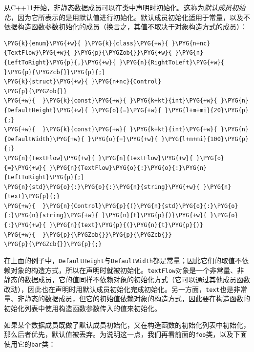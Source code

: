 
从C++11开始，非静态数据成员可以在类中声明时初始化。这称为\textit{默认成员初始化}，因为它所表示的是用默认值进行初始化。默认成员初始化适用于常量，以及不依据构造函数参数初始化的成员（换言之，其值不取决于对象构造方式的成员）：



\begin{codeblockbg}
\begin{Verbatim}[commandchars=\\\{\},breaklines=true,breakanywhere=true,fontsize=\codefont,xleftmargin=17bp]
\PYG{k}{enum}\PYG{+w}{ }\PYG{k}{class}\PYG{+w}{ }\PYG{n+nc}{TextFlow}\PYG{+w}{ }\PYG{p}{\PYGZob{}}\PYG{+w}{ }\PYG{n}{LeftToRight}\PYG{p}{,}\PYG{+w}{ }\PYG{n}{RightToLeft}\PYG{+w}{ }\PYG{p}{\PYGZcb{}}\PYG{p}{;}
\PYG{k}{struct}\PYG{+w}{ }\PYG{n+nc}{Control}
\PYG{p}{\PYGZob{}}
\PYG{+w}{  }\PYG{k}{const}\PYG{+w}{ }\PYG{k+kt}{int}\PYG{+w}{ }\PYG{n}{DefaultHeight}\PYG{+w}{ }\PYG{o}{=}\PYG{+w}{ }\PYG{l+m+mi}{20}\PYG{p}{;}
\PYG{+w}{  }\PYG{k}{const}\PYG{+w}{ }\PYG{k+kt}{int}\PYG{+w}{ }\PYG{n}{DefaultWidth}\PYG{+w}{ }\PYG{o}{=}\PYG{+w}{ }\PYG{l+m+mi}{100}\PYG{p}{;}
\PYG{n}{TextFlow}\PYG{+w}{ }\PYG{n}{textFlow}\PYG{+w}{ }\PYG{o}{=}\PYG{+w}{ }\PYG{n}{TextFlow}\PYG{o}{:}\PYG{o}{:}\PYG{n}{LeftToRight}\PYG{p}{;}
\PYG{n}{std}\PYG{o}{:}\PYG{o}{:}\PYG{n}{string}\PYG{+w}{ }\PYG{n}{text}\PYG{p}{;}
\PYG{+w}{  }\PYG{n}{Control}\PYG{p}{(}\PYG{n}{std}\PYG{o}{:}\PYG{o}{:}\PYG{n}{string}\PYG{+w}{ }\PYG{n}{t}\PYG{p}{)}\PYG{+w}{ }\PYG{o}{:}\PYG{+w}{ }\PYG{n}{text}\PYG{p}{(}\PYG{n}{t}\PYG{p}{)}
\PYG{+w}{  }\PYG{p}{\PYGZob{}}\PYG{p}{\PYGZcb{}}
\PYG{p}{\PYGZcb{}}\PYG{p}{;}
\end{Verbatim}
\end{codeblockbg}


在上面的例子中，\texttt{DefaultHeight}与\texttt{DefaultWidth}都是常量；因此它们的取值不依赖对象的构造方式，所以在声明时就被初始化。\texttt{textFlow}对象是一个非常量、非静态的数据成员，它的值同样不依赖对象的初始化方式（它可以通过其他成员函数改动），因此也在声明时用默认成员初始化完成初始化。另一方面，\texttt{text}也是非常量、非静态的数据成员，但它的初始值依赖对象的构造方式，因此要在构造函数的初始化列表中使用构造函数参数传入的值来初始化。



如果某个数据成员既做了默认成员初始化，又在构造函数的初始化列表中初始化，那么后者优先，默认值被丢弃。为说明这一点，我们再看前面的\texttt{foo}类，以及下面使用它的\texttt{bar}类：



